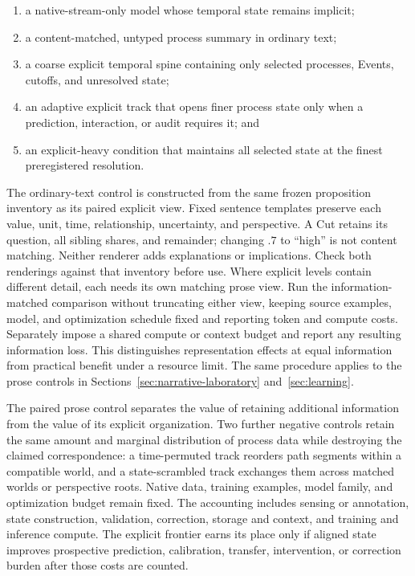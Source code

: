 \documentclass[10pt]{article}
\begin{document}
\begin{enumerate}
  \item a native-stream-only model whose temporal state remains implicit;
  \item a content-matched, untyped process summary in ordinary text;
  \item a coarse explicit temporal spine containing only selected processes,
    Events, cutoffs, and unresolved state;
  \item an adaptive explicit track that opens finer process state only when a
    prediction, interaction, or audit requires it; and
  \item an explicit-heavy condition that maintains all selected state at the
    finest preregistered resolution.
\end{enumerate}

The ordinary-text control is constructed from the same frozen proposition
inventory as its paired explicit view. Fixed sentence templates preserve each
value, unit, time, relationship, uncertainty, and perspective. A Cut retains
its question, all sibling shares, and remainder; changing $.7$ to ``high'' is
not content matching. Neither renderer adds explanations or implications.
Check both renderings against that inventory before use. Where explicit levels
contain different detail, each needs its own matching prose view.
Run the information-matched comparison without truncating either view, keeping
source examples, model, and optimization schedule fixed and reporting token
and compute costs. Separately impose a shared compute or context budget and
report any resulting information loss. This distinguishes representation
effects at equal information from practical benefit under a resource limit.
The same procedure applies to the prose controls in
Sections~\ref{sec:narrative-laboratory} and~\ref{sec:learning}.

The paired prose control separates the value of retaining additional
information from the value of its explicit organization.
Two further negative controls retain
the same amount and marginal distribution of process data while destroying the
claimed correspondence: a time-permuted track reorders path segments within a
compatible world, and a state-scrambled track exchanges them across matched
worlds or perspective roots. Native data, training examples, model family, and optimization
budget remain fixed. The accounting includes sensing or annotation, state
construction, validation, correction, storage and context, and training and
inference compute. The explicit frontier earns its place only if aligned state
improves prospective prediction, calibration, transfer, intervention, or
correction burden after those costs are counted.
\end{document}
